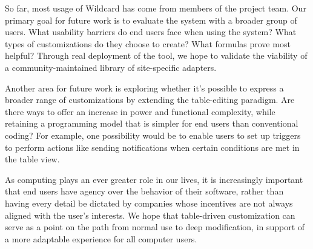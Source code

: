 \documentclass[sigplan,screen,10pt,anonymous,review]{acmart}
\begin{document}
So far, most usage of Wildcard has come from members of the project
team. Our primary goal for future work is to evaluate the system with a
broader group of users. What usability barriers do end users face when
using the system? What types of customizations do they choose to create?
What formulas prove most helpful? Through real deployment of the tool,
we hope to validate the viability of a community-maintained library of
site-specific adapters.

Another area for future work is exploring whether it's possible to
express a broader range of customizations by extending the table-editing
paradigm. Are there ways to offer an increase in power and functional
complexity, while retaining a programming model that is simpler for end
users than conventional coding? For example, one possibility would be to
enable users to set up triggers to perform actions like sending
notifications when certain conditions are met in the table view.

As computing plays an ever greater role in our lives, it is increasingly
important that end users have agency over the behavior of their
software, rather than having every detail be dictated by companies whose
incentives are not always aligned with the user's interests. We hope
that table-driven customization can serve as a point on the path from
normal use to deep modification, in support of a more adaptable
experience for all computer users.



\end{document}
